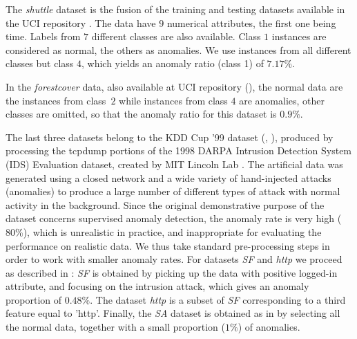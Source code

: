 The \emph{shuttle} dataset is the fusion of the training and testing datasets
available in the UCI repository \cite{Lichman2013}. The data have $9$
 numerical attributes,  the first one being time. Labels from $7$ different classes are also
 available. Class $1$ instances are considered as normal, the others as anomalies. 
We use instances from all different classes but class $4$,  %
which yields an anomaly ratio (class 1) of $7.17\%$. %
%

In the \emph{forestcover} data, also available at UCI
repository (\cite{Lichman2013}), the normal data are the  instances
from class~$2$ while instances from class $4$ are anomalies, other classes are omitted, 
so that the  anomaly ratio for this dataset is  $0.9\%$. 
%

The last three datasets belong to the KDD Cup '99 dataset
(\cite{KDD99}, \cite{Tavallaee2009}), produced by processing the
tcpdump portions of the 1998 DARPA Intrusion Detection System (IDS)
Evaluation dataset, created by MIT Lincoln Lab \cite{Lippmann2000}.
The artificial data was generated using a closed network and a wide
variety of hand-injected attacks (anomalies) to produce a large number
of different types of attack with normal activity in the background.
Since the original demonstrative purpose of the dataset concerns
supervised anomaly detection, the anomaly rate is very high ($80\%$), which is
unrealistic in practice, and inappropriate for evaluating the
performance on realistic data.  We thus take standard pre-processing
steps in order to work with smaller anomaly rates. For datasets
\emph{SF} and \emph{http} we proceed as described in
\cite{Yamanishi2000}: \emph{SF} is obtained by picking up the data
with positive logged-in attribute,
and %
focusing on the intrusion attack, which gives an anomaly proportion of
$0.48\%.$ %
The dataset \emph{http} is a subset of \emph{SF} corresponding to a
third feature equal to 'http'.
%
Finally, the \emph{SA} dataset  is obtained as in \cite{Eskin2002} by 
selecting all the normal data, together with a small proportion
($1\%$) of anomalies. %
%

